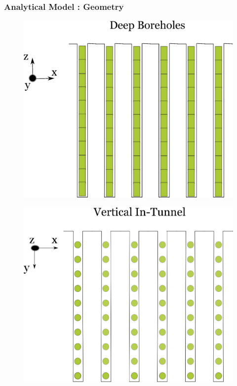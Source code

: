 \begin{frame}
  \frametitle{Analytical Model : Geometry}
  \begin{minipage}{0.3\textwidth}
    \begin{figure}[h!]
      \includegraphics[width=\textwidth]{boreholes.eps}
    \end{figure}
    \begin{figure}[h!]
      \includegraphics[width=\textwidth]{vertical.eps}
    \end{figure}
  \end{minipage}

\end{frame}
